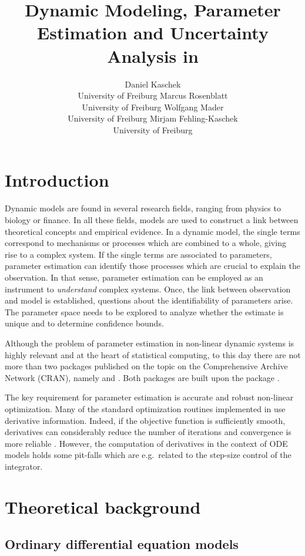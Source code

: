 \documentclass[article]{jss}
\author{Daniel Kaschek\\University of Freiburg \And
	Marcus Rosenblatt\\University of Freiburg \AND
	Wolfgang Mader\\University of Freiburg \And
	Mirjam Fehling-Kaschek\\University of Freiburg}
\title{Dynamic Modeling, Parameter Estimation and Uncertainty Analysis in \proglang{R}}
\begin{document}
\section{Introduction}
Dynamic models are found in several research fields, ranging from physics to biology or finance. In all these fields, models are used to construct a link between theoretical concepts and empirical evidence. In a dynamic model, the single terms correspond to mechanisms or processes which are combined to a whole, giving rise to a complex system. If the single terms are associated to parameters, parameter estimation can identify those processes which are crucial to explain the observation. In that sense, parameter estimation can be employed as an instrument to \textit{understand} complex systems. Once, the link between observation and model is established, questions about the identifiability of parameters arise. The parameter space needs to be explored to analyze whether the estimate is unique and to determine confidence bounds.

Although the problem of parameter estimation in non-linear dynamic systems is highly relevant and at the heart of statistical computing, to this day there are not more than two  packages published on the topic on the Comprehensive  Archive Network (CRAN), namely  \citep{FME} and  \citep{nlmeODE}. Both packages are built upon the  package \citep{deSolve}.


The key requirement for parameter estimation is accurate and robust non-linear optimization. Many of the standard optimization routines implemented in  use derivative information. Indeed, if the objective function is sufficiently smooth, derivatives can considerably reduce the number of iterations and convergence is more reliable \citep{raue2013lessons}. However, the computation of derivatives in the context of ODE models holds some pit-falls which are e.g.~related to the step-size control of the integrator.
	






\section{Theoretical background}

\subsection{Ordinary differential equation models}
\end{document}
